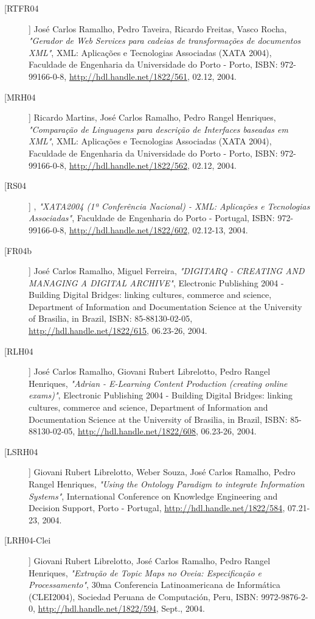 \begin{description}
\item[[RTFR04]]
    \textsf{José Carlos Ramalho, Pedro Taveira, Ricardo Freitas, Vasco Rocha}, \emph{"Gerador de Web Services para cadeias de transformações de documentos XML"}, XML: Aplicações e Tecnologias Associadas (XATA 2004), Faculdade de Engenharia da Universidade do Porto - Porto, ISBN: 972-99166-0-8, \url{http://hdl.handle.net/1822/561}, 02.12, 2004.

\item[[MRH04]]
    \textsf{Ricardo Martins, José Carlos Ramalho, Pedro Rangel Henriques}, \emph{"Comparação de Linguagens para descrição de Interfaces baseadas em XML"}, XML: Aplicações e Tecnologias Associadas (XATA 2004), Faculdade de Engenharia da Universidade do Porto - Porto, ISBN: 972-99166-0-8, \url{http://hdl.handle.net/1822/562}, 02.12, 2004.

\item[[RS04]]
    \textsf{}, \emph{"XATA2004 (1ª Conferência Nacional) - XML: Aplicações e Tecnologias Associadas"}, Faculdade de Engenharia do Porto - Portugal, ISBN: 972-99166-0-8, \url{http://hdl.handle.net/1822/602}, 02.12-13, 2004.

\item[[FR04b]]
    \textsf{José Carlos Ramalho, Miguel Ferreira}, \emph{"DIGITARQ - CREATING AND MANAGING A DIGITAL ARCHIVE"}, Electronic Publishing 2004 - Building Digital Bridges: linking cultures, commerce and science, Department of Information and Documentation Science at the University of Brasilia, in Brazil, ISBN: 85-88130-02-05, \url{http://hdl.handle.net/1822/615}, 06.23-26, 2004.

\item[[RLH04]]
    \textsf{José Carlos Ramalho, Giovani Rubert Librelotto, Pedro Rangel Henriques}, \emph{"Adrian - E-Learning Content Production (creating online exams)"}, Electronic Publishing 2004 - Building Digital Bridges: linking cultures, commerce and science, Department of Information and Documentation Science at the University of Brasilia, in Brazil, ISBN: 85-88130-02-05, \url{http://hdl.handle.net/1822/608}, 06.23-26, 2004.

\item[[LSRH04]]
    \textsf{Giovani Rubert Librelotto, Weber Souza, José Carlos Ramalho, Pedro Rangel Henriques}, \emph{"Using the Ontology Paradigm to integrate Information Systems"}, International Conference on Knowledge Engineering and Decision Support, Porto - Portugal, \url{http://hdl.handle.net/1822/584}, 07.21-23, 2004.

\item[[LRH04-Clei]]
    \textsf{Giovani Rubert Librelotto, José Carlos Ramalho, Pedro Rangel Henriques}, \emph{"Extração de Topic Maps no Oveia: Especificação e Processamento"}, 30ma Conferencia Latinoamericana de Informática (CLEI2004), Sociedad Peruana de Computación, Peru, ISBN: 9972-9876-2-0, \url{http://hdl.handle.net/1822/594}, Sept., 2004.


\end{description}
